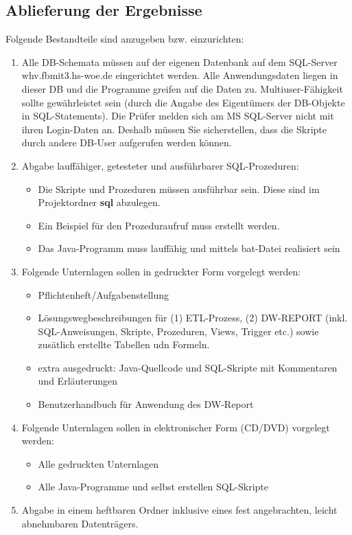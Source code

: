 \subsection{Ablieferung der Ergebnisse}
Folgende Bestandteile sind anzugeben bzw. einzurichten:
\begin{enumerate}
  \item Alle DB-Schemata müssen auf der eigenen Datenbank auf dem SQL-Server whv.fbmit3.hs-woe.de eingerichtet werden. Alle Anwendungsdaten liegen in dieser DB und die Programme greifen auf die Daten zu. Multiuser-Fähigkeit sollte gewährleistet sein (durch die Angabe des Eigentümers der DB-Objekte in SQL-Statements). Die Prüfer melden sich am MS SQL-Server nicht mit ihren Login-Daten an. Deshalb müssen Sie sicherstellen, dass die Skripte durch andere DB-User aufgerufen werden können.
  \item Abgabe lauffähiger, getesteter und ausführbarer SQL-Prozeduren: \begin{itemize}
    \item Die Skripte und Prozeduren müssen ausführbar sein. Diese sind im Projektordner \textbf{sql} abzulegen.
    \item Ein Beispiel für den Prozeduraufruf muss erstellt werden.
    \item Das Java-Programm muss lauffähig und mittels bat-Datei realisiert sein
  \end{itemize}
  \item Folgende Unternlagen sollen in gedruckter Form vorgelegt werden: \begin{itemize}
    \item Pflichtenheft/Aufgabenstellung
    \item Lösungswegbeschreibungen für (1) ETL-Prozess, (2) DW-REPORT (inkl. SQL-Anweisungen, Skripte, Prozeduren, Views, Trigger etc.) sowie zusätlich erstellte Tabellen udn Formeln.
    \item extra ausgedruckt: Java-Quellcode und SQL-Skripte mit Kommentaren und Erläuterungen
    \item Benutzerhandbuch für Anwendung des DW-Report
  \end{itemize}
  \item Folgende Unternlagen sollen in elektronischer Form (CD/DVD) vorgelegt werden: \begin{itemize}
    \item Alle gedruckten Unternlagen
    \item Alle Java-Programme und selbst erstellen SQL-Skripte
  \end{itemize}
  \item Abgabe in einem heftbaren Ordner inklusive eines fest angebrachten, leicht abnehmbaren Datenträgers.
\end{enumerate}
